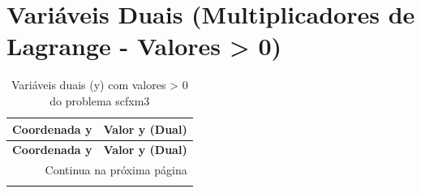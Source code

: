 \documentclass[12pt]{article}
\begin{document}
\section{Variáveis Duais (Multiplicadores de Lagrange - Valores > 0)}

\begin{longtable}{@{}cc@{}}
\caption{Variáveis duais (y) com valores > 0 do problema scfxm3} \\
\toprule
\textbf{Coordenada y} & \textbf{Valor y (Dual)} \\
\midrule
\endfirsthead

\toprule
\textbf{Coordenada y} & \textbf{Valor y (Dual)} \\
\midrule
\endhead

\midrule \multicolumn{2}{r}{{Continua na próxima página}} \\ \midrule
\endfoot


\end{longtable}
\end{document}
